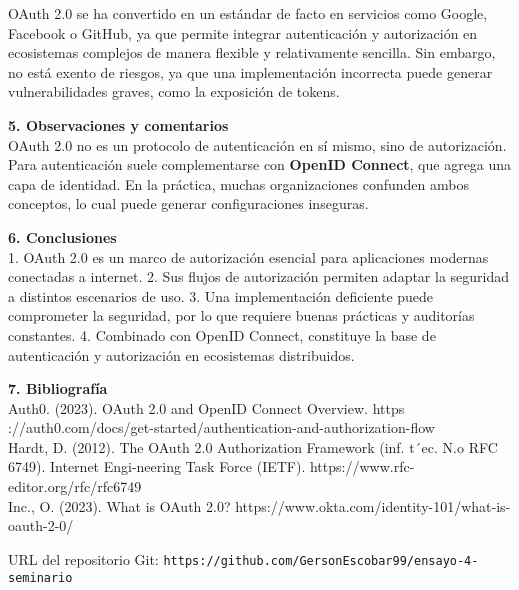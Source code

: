 \documentclass[12pt]{article}
\begin{document}
OAuth 2.0 se ha convertido en un estándar de facto en servicios como Google, Facebook o GitHub, ya que permite integrar autenticación y autorización en ecosistemas complejos de manera flexible y relativamente sencilla. Sin embargo, no está exento de riesgos, ya que una implementación incorrecta puede generar vulnerabilidades graves, como la exposición de tokens.

\textbf{5. Observaciones y comentarios}  
\\
OAuth 2.0 no es un protocolo de autenticación en sí mismo, sino de autorización. Para autenticación suele complementarse con \textbf{OpenID Connect}, que agrega una capa de identidad. En la práctica, muchas organizaciones confunden ambos conceptos, lo cual puede generar configuraciones inseguras.

\textbf{6. Conclusiones}  
\\
1. OAuth 2.0 es un marco de autorización esencial para aplicaciones modernas conectadas a internet.  
2. Sus flujos de autorización permiten adaptar la seguridad a distintos escenarios de uso.  
3. Una implementación deficiente puede comprometer la seguridad, por lo que requiere buenas prácticas y auditorías constantes.  
4. Combinado con OpenID Connect, constituye la base de autenticación y autorización en ecosistemas distribuidos.  

\textbf{7. Bibliografía}  
\\
Auth0. (2023). OAuth 2.0 and OpenID Connect Overview. https ://auth0.com/docs/get-started/authentication-and-authorization-flow
\\
Hardt, D. (2012). The OAuth 2.0 Authorization Framework (inf. t´ec. N.o RFC 6749). Internet Engi-neering Task Force (IETF). https://www.rfc-editor.org/rfc/rfc6749
\\
Inc., O. (2023). What is OAuth 2.0? https://www.okta.com/identity-101/what-is-oauth-2-0/

\vspace{0.5cm}
\noindent URL del repositorio Git: \texttt{https://github.com/GersonEscobar99/ensayo-4-seminario}
\end{document}
